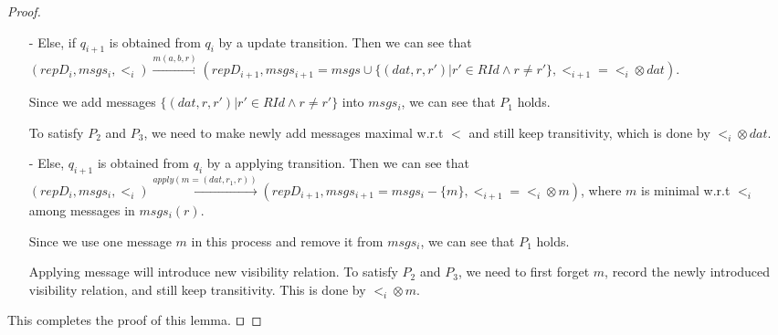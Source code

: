 {\begin {proof}
\begin{itemize}
\begin{itemize}
    \item[-] Else, if $q_{i+1}$ is obtained from $q_i$ by a update transition. Then we can see that $(repD_i,msgs_i,<_i) {\xrightarrow{m(a,b,r)}} (repD_{i+1},msgs_{i+1}=msgs \cup \{ (dat,r,r') \vert  r' \in RId \wedge r \neq r' \},<_{i+1} = <_i \otimes dat)$.

        Since we add messages $\{ (dat,r,r') \vert  r' \in RId \wedge r \neq r' \}$ into $msgs_i$, we can see that $P_1$ holds.

        To satisfy $P_2$ and $P_3$, we need to make newly add messages maximal w.r.t $<$ and still keep transitivity, which is done by $<_i \otimes dat$.

    \item[-] Else, $q_{i+1}$ is obtained from $q_i$ by a applying transition. Then we can see that $(repD_i,msgs_i,<_i) {\xrightarrow{apply(m=(dat,r_1,r))}} (repD_{i+1},msgs_{i+1} = msgs_i - \{ m \}, <_{i+1} = <_i \otimes m )$, where $m$ is minimal w.r.t $<_i$ among messages in $msgs_i(r)$.

        Since we use one message $m$ in this process and remove it from $msgs_i$, we can see that $P_1$ holds.

        Applying message will introduce new visibility relation. To satisfy $P_2$ and $P_3$, we need to first forget $m$, record the newly introduced visibility relation, and still keep transitivity. This is done by $<_i \otimes m$.
    \end{itemize}
\end{itemize}

This completes the proof of this lemma. $\qed$
\end {proof}
}





